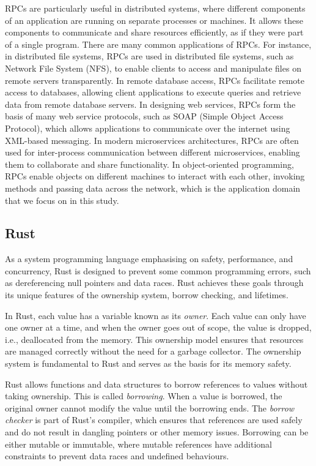 RPCs are particularly useful in distributed systems, where different components of an application are running on separate processes or machines. It allows these components to communicate and share resources efficiently, as if they were part of a single program. There are many common applications of RPCs. For instance, in distributed file systems, RPCs are used in distributed file systems, such as Network File System (NFS), to enable clients to access and manipulate files on remote servers transparently. In remote database access, RPCs facilitate remote access to databases, allowing client applications to execute queries and retrieve data from remote database servers. In designing web services, RPCs form the basis of many web service protocols, such as SOAP (Simple Object Access Protocol), which allows applications to communicate over the internet using XML-based messaging. In modern microservices architectures, RPCs are often used for inter-process communication between different microservices, enabling them to collaborate and share functionality. In object-oriented programming, RPCs enable objects on different machines to interact with each other, invoking methods and passing data across the network, which is the application domain that we focus on in this study.

\subsection{Rust}
\label{chap3:background:rust}
As a system programming language emphasising on safety, performance, and concurrency, Rust is designed to prevent some common programming errors, such as dereferencing null pointers and data races. Rust achieves these goals through its unique features of the ownership system, borrow checking, and lifetimes.

In Rust, each value has a variable known as its \emph{owner}. Each value can only have one owner at a time, and when the owner goes out of scope, the value is dropped, i.e., deallocated from the memory. This ownership model ensures that resources are managed correctly without the need for a garbage collector. The ownership system is fundamental to Rust and serves as the basis for its memory safety.

Rust allows functions and data structures to borrow references to values without taking ownership. This is called \emph{borrowing}. When a value is borrowed, the original owner cannot modify the value until the borrowing ends. The \emph{borrow checker} is part of Rust's compiler, which ensures that references are used safely and do not result in dangling pointers or other memory issues. Borrowing can be either mutable or immutable, where mutable references have additional constraints to prevent data races and undefined behaviours.

